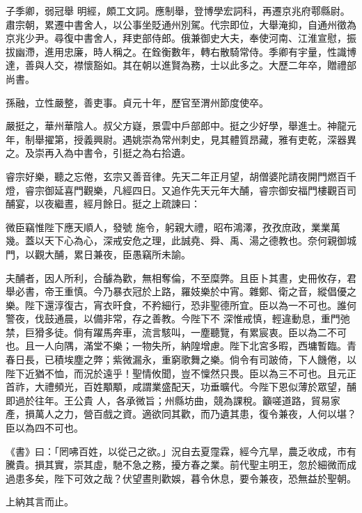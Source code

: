 \begin{pinyinscope}
 子季卿，弱冠舉
 明經，頗工文詞。應制舉，登博學宏詞科，再遷京兆府鄠縣尉。肅宗朝，累遷中書舍人，以公事坐貶通州別駕。代宗即位，大舉淹抑，自通州徵為京兆少尹。尋復中書舍人，拜吏部侍郎。俄兼御史大夫，奉使河南、江淮宣慰，振拔幽滯，進用忠廉，時人稱之。在銓衡數年，轉右散騎常侍。季卿有宇量，性識博達，善與人交，襟懷豁如。其在朝以進賢為務，士以此多之。大歷二年卒，贈禮部尚書。



 孫融，立性嚴整，善吏事。貞元十年，歷官至渭州節度使卒。



 嚴挺之，華州華陰人。叔父方嶷，景雲中戶部郎中。挺之少好學，舉進士。神龍元年，制舉擢第，授義興尉。遇姚崇為常州刺史，見其體質昂藏，雅有吏乾，深器異之。及崇再入為中書令，引挺之為右拾遺。



 睿宗好樂，聽之忘倦，玄宗又善音律。先天二年正月望，胡僧婆陀請夜開門燃百千燈，睿宗御延喜門觀樂，凡經四日。又追作先天元年大酺，睿宗御安福門樓觀百司酺宴，以夜繼晝，經月餘日。挺之上疏諫曰：



 微臣竊惟陛下應天順人，發號
 施令，躬親大禮，昭布鴻澤，孜孜庶政，業業萬幾。蓋以天下心為心，深戒安危之理，此誠堯、舜、禹、湯之德教也。奈何親御城門，以觀大酺，累日兼夜，臣愚竊所未諭。



 夫酺者，因人所利，合醵為歡，無相奪倫，不至糜弊。且臣卜其晝，史冊攸存，君舉必書，帝王重慎。今乃暴衣冠於上路，羅妓樂於中宵。雜鄭、衛之音，縱倡優之樂。陛下還淳復古，宵衣旰食，不矜細行，恐非聖德所宜。臣以為一不可也。誰何警夜，伐鼓通晨，以備非常，存之善教。今陛下不
 深惟戒慎，輕違動息，重門弛禁，巨猾多徒。倘有躍馬奔車，流言駭叫，一塵聽覽，有累宸衷。臣以為二不可也。且一人向隅，滿堂不樂；一物失所，納隍增慮。陛下北宮多暇，西墉暫臨。青春日長，已積埃塵之弊；紫微漏永，重窮歌舞之樂。倘令有司跛倚，下人饑倦，以陛下近猶不恤，而況於遠乎！聖情攸聞，豈不懍然只畏。臣以為三不可也。且元正首祚，大禮頻光，百姓顒顒，咸謂業盛配天，功垂曠代。今陛下恩似薄於眾望，酺即過於往年。王公貴
 人，各承微旨；州縣坊曲，競為課稅。籲嗟道路，貿易家產，損萬人之力，營百戲之資。適欲同其歡，而乃遺其患，復令兼夜，人何以堪？臣以為四不可也。



 《書》曰：「罔咈百姓，以從己之欲。」況自去夏霪霖，經今亢旱，農乏收成，市有騰貴。損其實，崇其虛，馳不急之務，擾方春之業。前代聖主明王，忽於細微而成過患多矣，陛下可效之哉？伏望晝則歡娛，暮令休息，要令兼夜，恐無益於聖朝。



 上納其言而止。




\end{pinyinscope}
